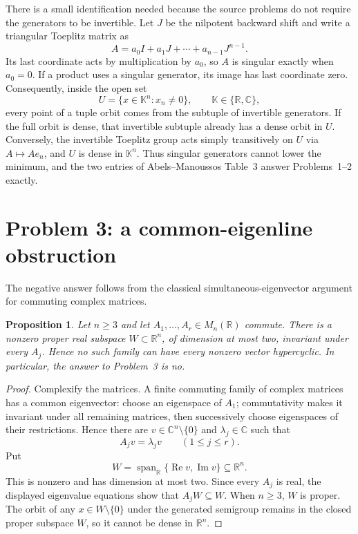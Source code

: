 \documentclass[11pt]{article}
\newtheorem{proposition}{Proposition}
\newcommand{\R}{\mathbb R}
\newcommand{\C}{\mathbb C}
\begin{document}
There is a small identification needed because the source problems do not
require the generators to be invertible.  Let $J$ be the nilpotent backward
shift and write a triangular Toeplitz matrix as
\[
 A=a_0I+a_1J+\cdots+a_{n-1}J^{n-1}.
\]
Its last coordinate acts by multiplication by $a_0$, so $A$ is singular
exactly when $a_0=0$.  If a product uses a singular generator, its image has
last coordinate zero.  Consequently, inside the open set
\[
 U=\{x\in\mathbb K^n:x_n\ne0\},\qquad \mathbb K\in\{\R,\C\},
\]
every point of a tuple orbit comes from the subtuple of invertible
generators.  If the full orbit is dense, that invertible subtuple already has
a dense orbit in $U$.  Conversely, the invertible Toeplitz group acts simply
transitively on $U$ via $A\mapsto Ae_n$, and $U$ is dense in $\mathbb K^n$.
Thus singular generators cannot lower the minimum, and the two entries of
Abels--Manoussos Table~3 answer Problems~1--2 exactly.

\section{Problem 3: a common-eigenline obstruction}

The negative answer follows from the classical simultaneous-eigenvector
argument for commuting complex matrices.

\begin{proposition}
Let $n\ge3$ and let $A_1,\ldots,A_r\in M_n(\R)$ commute.  There is a nonzero
proper real subspace $W\subset\R^n$, of dimension at most two, invariant under
every $A_j$.  Hence no such family can have every nonzero vector hypercyclic.
In particular, the answer to Problem~3 is no.
\end{proposition}

\begin{proof}
Complexify the matrices.  A finite commuting family of complex matrices has a
common eigenvector: choose an eigenspace of $A_1$; commutativity makes it
invariant under all remaining matrices, then successively choose eigenspaces
of their restrictions.  Hence there are $v\in\C^n\setminus\{0\}$ and
$\lambda_j\in\C$ such that
\[
 A_jv=\lambda_jv\qquad(1\le j\le r).
\]
Put
\[
 W=\operatorname{span}_{\R}\{\operatorname{Re}v,
                              \operatorname{Im}v\}\subseteq\R^n.
\]
This is nonzero and has dimension at most two.  Since every $A_j$ is real,
the displayed eigenvalue equations show that $A_jW\subseteq W$.  When
$n\ge3$, $W$ is proper.  The orbit of any $x\in W\setminus\{0\}$ under the
generated semigroup remains in the closed proper subspace $W$, so it cannot
be dense in $\R^n$.
\end{proof}
\end{document}
